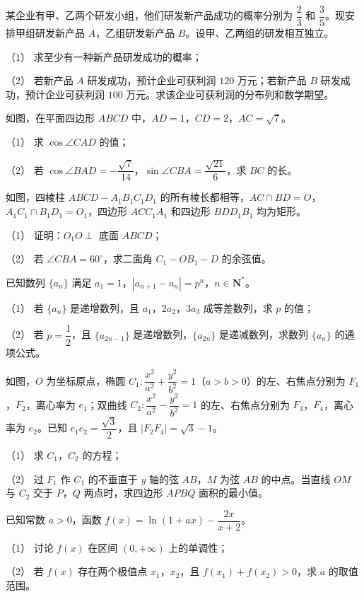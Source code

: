 \begin{question}
某企业有甲、乙两个研发小组，他们研发新产品成功的概率分别为 $\dfrac23$ 和 $\dfrac35$。现安排甲组研发新产品 $A$，乙组研发新产品 $B$。设甲、乙两组的研发相互独立。

（1） 求至少有一种新产品研发成功的概率；

（2） 若新产品 $A$ 研发成功，预计企业可获利润 $120$ 万元；若新产品 $B$ 研发成功，预计企业可获利润 $100$ 万元。求该企业可获利润的分布列和数学期望。

\Needspace{0.4\textheight}
\end{question}
\begin{question}
如图，在平面四边形 $ABCD$ 中，$AD=1$，$CD=2$，$AC=\sqrt7$。
\nopagebreak[4]
\begin{center}\end{center}
\nopagebreak[4]
（1） 求 $\cos\angle CAD$ 的值；

（2） 若 $\cos\angle BAD=-\dfrac{\sqrt7}{14}$，$\sin\angle CBA=\dfrac{\sqrt{21}}6$，求 $BC$ 的长。

\Needspace{0.4\textheight}
\end{question}
\begin{question}
如图，四棱柱 $ABCD-A_1B_1C_1D_1$ 的所有棱长都相等，$AC\cap BD=O$，$A_1C_1\cap B_1D_1=O_1$，四边形 $ACC_1A_1$ 和四边形 $BDD_1B_1$ 均为矩形。
\nopagebreak[4]
\begin{center}\end{center}
\nopagebreak[4]
（1） 证明：$O_1O\perp$ 底面 $ABCD$；

（2） 若 $\angle CBA=60^\circ$，求二面角 $C_1-OB_1-D$ 的余弦值。

\end{question}
\begin{question}
已知数列 $\{a_n\}$ 满足 $a_1=1$，$|a_{n+1}-a_n|=p^n$，$n\in\mathbf N^*$。

（1） 若 $\{a_n\}$ 是递增数列，且 $a_1$，$2a_2$，$3a_3$ 成等差数列，求 $p$ 的值；

（2） 若 $p=\dfrac12$，且 $\{a_{2n-1}\}$ 是递增数列，$\{a_{2n}\}$ 是递减数列，求数列 $\{a_n\}$ 的通项公式。

\Needspace{0.4\textheight}
\end{question}
\begin{question}
如图，$O$ 为坐标原点，椭圆 $C_1:\dfrac{x^2}{a^2}+\dfrac{y^2}{b^2}=1$（$a>b>0$）的左、右焦点分别为 $F_1$，$F_2$，离心率为 $e_1$；双曲线 $C_2:\dfrac{x^2}{a^2}-\dfrac{y^2}{b^2}=1$ 的左、右焦点分别为 $F_3$，$F_4$，离心率为 $e_2$。已知 $e_1e_2=\dfrac{\sqrt3}2$，且 $|F_2F_4|=\sqrt3-1$。
\nopagebreak[4]
\begin{center}\end{center}
\nopagebreak[4]
（1） 求 $C_1$，$C_2$ 的方程；

（2） 过 $F_1$ 作 $C_1$ 的不垂直于 $y$ 轴的弦 $AB$，$M$ 为弦 $AB$ 的中点。当直线 $OM$ 与 $C_2$ 交于 $P$，$Q$ 两点时，求四边形 $APBQ$ 面积的最小值。

\end{question}
\begin{question}
已知常数 $a>0$，函数 $f(x)=\ln(1+ax)-\dfrac{2x}{x+2}$。

（1） 讨论 $f(x)$ 在区间 $(0,+\infty)$ 上的单调性；

（2） 若 $f(x)$ 存在两个极值点 $x_1$，$x_2$，且 $f(x_1)+f(x_2)>0$，求 $a$ 的取值范围。

\end{question}